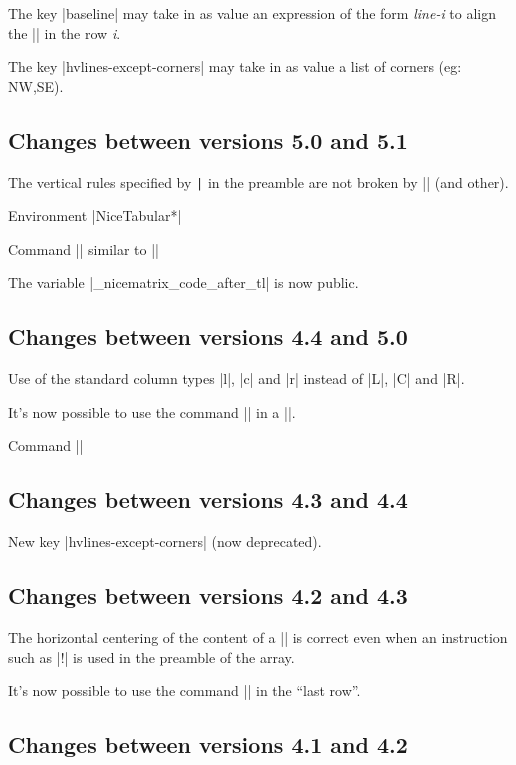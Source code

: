 \documentclass[dvipsnames]{article}%
\begin{document}
The key |baseline| may take in as value an expression of the form
\textsl{line-i} to align the |\hline| in the row \textsl{i}.

The key |hvlines-except-corners| may take in as value a list of corners (eg: NW,SE).

\subsection*{Changes between versions 5.0 and 5.1}

The vertical rules specified by \verb+|+ in the preamble are not broken by
|\hline\hline| (and other).

Environment |{NiceTabular*}|

Command |\Vdotsfor| similar to |\Hdotsfor|

The variable |\g_nicematrix_code_after_tl| is now public.

\subsection*{Changes between versions 4.4 and 5.0}

Use of the standard column types |l|, |c| and |r| instead of |L|, |C| and |R|.

It's now possible to use the command |\diagbox| in a |\Block|.

Command |\tabularnote|

\subsection*{Changes between versions 4.3 and 4.4}

New key |hvlines-except-corners| (now deprecated).

\subsection*{Changes between versions 4.2 and 4.3}

The horizontal centering of the content of a |\Block| is correct even when an
instruction such as |!{\qquad}| is used in the preamble of the array.

It's now possible to use the command |\Block| in the ``last row''.

\subsection*{Changes between versions 4.1 and 4.2}
\end{document}
